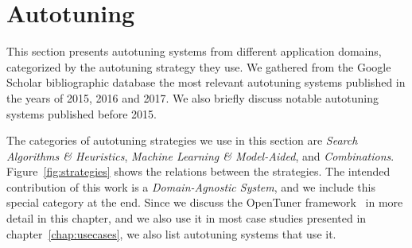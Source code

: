 %
%
%
%
%
%
%
%

\section{Autotuning}
\label{sec:autotuning}

This section presents autotuning systems from different application domains,
categorized by the autotuning strategy they use. We gathered from the Google
Scholar bibliographic database the most relevant autotuning systems published
in the years of 2015, 2016 and 2017. We also briefly discuss notable autotuning
systems published before 2015.

The categories of autotuning strategies we use in this section are
\textit{Search Algorithms \& Heuristics}, \textit{Machine Learning \&
Model-Aided}, and \textit{Combinations}. Figure~\ref{fig:strategies} shows the
relations between the strategies. The intended contribution of this work is a
\textit{Domain-Agnostic System}, and we include this special category at the
end. Since we discuss the OpenTuner framework~\cite{ansel2014opentuner} in more
detail in this chapter, and we also use it in most case studies presented in
chapter~\ref{chap:usecases}, we also list autotuning systems that use it.

